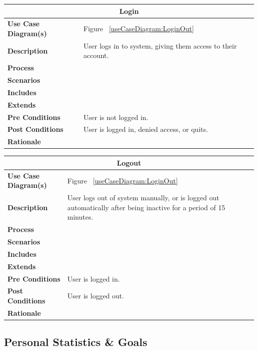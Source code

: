 \documentclass[12pt]{article}
\begin{document}
\begin{center}
\begin{tabularx}{\textwidth}{ |X|X|}
\hline
\multicolumn{2}{|c|}{\textbf{Login}}\\
\hline
\hline
\textbf{Use Case Diagram(s)} & Figure ~\ref{useCaseDiagram:LoginOut}\\ \hline
\textbf{Description} & User logs in to system, giving them access to their account. \\ \hline
\textbf{Process} & \\ \hline
\textbf{Scenarios} & \\ \hline
\textbf{Includes} & \\ \hline
\textbf{Extends} & \\ \hline
\textbf{Pre Conditions} & User is not logged in.\\ \hline
\textbf{Post Conditions} & User is logged in, denied access, or quits.\\ \hline
\textbf{Rationale} & \\ \hline
\end{tabularx}
\end{center}

\begin{center}
\begin{tabularx}{\textwidth}{ |X|X|}
\hline
\multicolumn{2}{|c|}{\textbf{Logout}}\\
\hline
\hline
\textbf{Use Case Diagram(s)} & Figure ~\ref{useCaseDiagram:LoginOut}\\ \hline
\textbf{Description} &  User logs out of system manually, or is logged out automatically after being inactive for a period of 15 minutes. \\ \hline
\textbf{Process} & \\ \hline
\textbf{Scenarios} & \\ \hline
\textbf{Includes} & \\ \hline
\textbf{Extends} & \\ \hline
\textbf{Pre Conditions} & User is logged in.\\ \hline
\textbf{Post Conditions} & User is logged out.\\ \hline
\textbf{Rationale} & \\ \hline
\end{tabularx}
\end{center}


\newpage
\subsection{Personal Statistics \& Goals}
\end{document}
